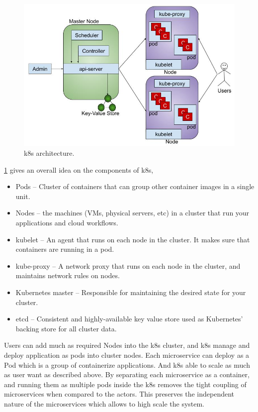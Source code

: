 \begin{figure}[htp]
    \centering
    \includegraphics[width=1\textwidth]{method/microservice/k8s_architecture_v3.jpg}
    \caption{\acrfull{k8s} architecture.}
    \label{fi:k8s_architecture}
\end{figure}
\cref{fi:k8s_architecture} gives an overall idea on the components of \acrshort{k8s},
\begin{itemize}
    \item Pods -- Cluster of containers that can group other container images in a single unit.
    \item Nodes -- the machines (VMs, physical servers, etc) in a cluster that run your applications and cloud workflows.
    \item kubelet -- An agent that runs on each node in the cluster. It makes sure that containers are running in a pod.
    \item kube-proxy -- A network proxy that runs on each node in the cluster, and maintains network rules on nodes.
    \item Kubernetes master -- Responsible for maintaining the desired state for your cluster.
    \item etcd -- Consistent and highly-available key value store used as Kubernetes’ backing store for all cluster data.
\end{itemize}

Users can add much as required Nodes into the \acrshort{k8s} cluster, and \acrshort{k8s} manage and deploy application as pods into cluster nodes.
Each microservice can deploy as a Pod which is a group of containerize applications. And \acrshort{k8s} able to scale as much as user want as described above.
By separating each microservice as a container, and running them as multiple pods inside the \acrshort{k8s} removes the tight coupling of microservices when compared to the actors. This preserves the independent nature of the microservices which allows to high scale the system.
